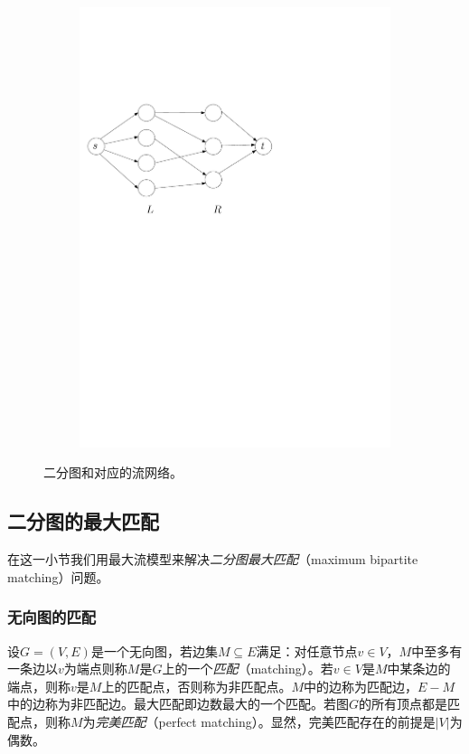 \documentclass[a4paper]{ctexbook}
\begin{document}
\begin{figure}
\begin{subfigure}[t]{0.4\linewidth}
      \includegraphics[scale=0.5]{figures/bipartite-network}
      \caption{}
    \end{subfigure}
    \caption{二分图和对应的流网络。}
    \label{Fig:bipartite-network}
  \end{figure}
  \subsection{二分图的最大匹配}
  在这一小节我们用最大流模型来解决\emph{二分图最大匹配}（maximum bipartite matching）问题。
  \subsubsection*{无向图的匹配}
  设$G=(V,E)$是一个无向图，若边集$M\subseteq E$满足：对任意节点$v\in V$，$M$中至多有一条边以$v$为端点则称$M$是$G$上的一个\emph{匹配}（matching）。若$v\in V$是$M$中某条边的端点，则称$v$是$M$上的匹配点，否则称为非匹配点。$M$中的边称为匹配边，$E-M$中的边称为非匹配边。最大匹配即边数最大的一个匹配。若图$G$的所有顶点都是匹配点，则称$M$为\emph{完美匹配}（perfect matching）。显然，完美匹配存在的前提是$|V|$为偶数。
\end{document}
